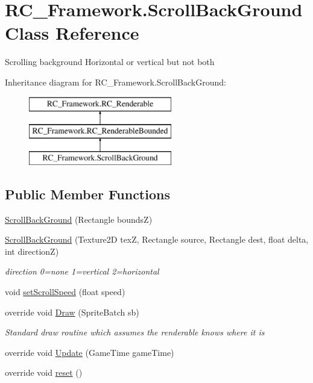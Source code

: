 \hypertarget{class_r_c___framework_1_1_scroll_back_ground}{}\section{R\+C\+\_\+\+Framework.\+Scroll\+Back\+Ground Class Reference}
\label{class_r_c___framework_1_1_scroll_back_ground}


Scrolling background Horizontal or vertical but not both  


Inheritance diagram for R\+C\+\_\+\+Framework.\+Scroll\+Back\+Ground\+:\begin{figure}[H]
\begin{center}
\leavevmode
\includegraphics[height=3.000000cm]{class_r_c___framework_1_1_scroll_back_ground}
\end{center}
\end{figure}
\subsection*{Public Member Functions}
\begin{DoxyCompactItemize}
\item 
\mbox{\hyperlink{class_r_c___framework_1_1_scroll_back_ground_aa7ce7d0dc4170243b94f399854918ab0}{Scroll\+Back\+Ground}} (Rectangle boundsZ)
\item 
\mbox{\hyperlink{class_r_c___framework_1_1_scroll_back_ground_added00d79c976a3e1bf2a90ff1e62666}{Scroll\+Back\+Ground}} (Texture2D texZ, Rectangle source, Rectangle dest, float delta, int directionZ)
\begin{DoxyCompactList}\small\item\em direction 0=none 1=vertical 2=horizontal \end{DoxyCompactList}\item 
void \mbox{\hyperlink{class_r_c___framework_1_1_scroll_back_ground_a51b38c4f29b384ab4421e420b3fd7201}{set\+Scroll\+Speed}} (float speed)
\item 
override void \mbox{\hyperlink{class_r_c___framework_1_1_scroll_back_ground_a7b9513679627c90648d41b952d4231d1}{Draw}} (Sprite\+Batch sb)
\begin{DoxyCompactList}\small\item\em Standard draw routine which assumes the renderable knows where it is \end{DoxyCompactList}\item 
override void \mbox{\hyperlink{class_r_c___framework_1_1_scroll_back_ground_ac999fc666d1abebe93d7d659e5a53e8a}{Update}} (Game\+Time game\+Time)
\item 
override void \mbox{\hyperlink{class_r_c___framework_1_1_scroll_back_ground_aeb2e92fd02bce76a76d4002aa94ff3d5}{reset}} ()
\end{DoxyCompactItemize}
